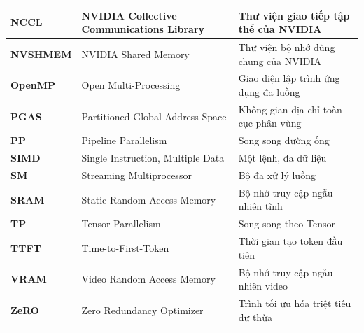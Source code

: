 \begin{table}[H]
\begin{tabularx}{\textwidth}{|l|L{0.9}|L{1.1}|}
        \hline
        \textbf{NCCL} & NVIDIA Collective Communications Library & Thư viện giao tiếp tập thể của NVIDIA \\
        \hline
        \textbf{NVSHMEM} & NVIDIA Shared Memory & Thư viện bộ nhớ dùng chung của NVIDIA \\
        \hline
        \textbf{OpenMP} & Open Multi-Processing & Giao diện lập trình ứng dụng đa luồng \\
        \hline
        \textbf{PGAS} & Partitioned Global Address Space & Không gian địa chỉ toàn cục phân vùng \\
        \hline
        \textbf{PP} & Pipeline Parallelism & Song song đường ống \\
        \hline
        \textbf{SIMD} & Single Instruction, Multiple Data & Một lệnh, đa dữ liệu \\
        \hline
        \textbf{SM} & Streaming Multiprocessor & Bộ đa xử lý luồng \\
        \hline
        \textbf{SRAM} & Static Random-Access Memory & Bộ nhớ truy cập ngẫu nhiên tĩnh \\
        \hline
        \textbf{TP} & Tensor Parallelism & Song song theo Tensor \\
        \hline
        \textbf{TTFT} & Time-to-First-Token & Thời gian tạo token đầu tiên \\
        \hline
        \textbf{VRAM} & Video Random Access Memory & Bộ nhớ truy cập ngẫu nhiên video \\
        \hline
        \textbf{ZeRO} & Zero Redundancy Optimizer & Trình tối ưu hóa triệt tiêu dư thừa \\
        \hline
    \end{tabularx}
\end{table}
\cleardoublepage